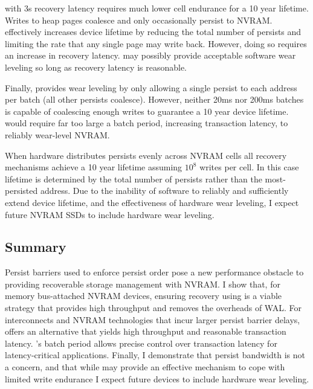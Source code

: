 \NVDisk with 3s recovery latency requires much lower cell endurance for a 10 year lifetime.
Writes to heap pages coalesce and only occasionally persist to NVRAM.
\NVDisk effectively increases device lifetime by reducing the total number of persists and limiting the rate that any single page may write back.
However, doing so requires an increase in recovery latency.
\NVDisk may possibly provide acceptable software wear leveling so long as recovery latency is reasonable.

Finally, \GroupCommit provides wear leveling by only allowing a single persist to each address per batch (all other persists coalesce).
However, neither 20ms nor 200ms batches is capable of coalescing enough writes to guarantee a 10 year device lifetime.
\GroupCommit would require far too large a batch period, increasing transaction latency, to reliably wear-level NVRAM.

When hardware distributes persists evenly across NVRAM cells all recovery mechanisms achieve a 10 year lifetime assuming $10^8$ writes per cell.
In this case lifetime is determined by the total number of persists rather than the most-persisted address.
Due to the inability of software to reliably and sufficiently extend device lifetime, and the effectiveness of hardware wear leveling, I expect future NVRAM SSDs to include hardware wear leveling.

\subsection{Summary}
\label{sec:OLTP_eval:Persists:Summary}
Persist barriers used to enforce persist order pose a new performance obstacle to providing recoverable storage management with NVRAM.
I show that, for memory bus-attached NVRAM devices, ensuring recovery using \InPlace is a viable strategy that provides high throughput and removes the overheads of WAL.
For interconnects and NVRAM technologies that incur larger persist barrier delays, \GroupCommit offers an alternative that yields high throughput and reasonable transaction latency.
\GroupCommit's batch period allows precise control over transaction latency for latency-critical applications.
Finally, I demonstrate that persist bandwidth is not a concern, and that while \NVDisk may provide an effective mechanism to cope with limited write endurance I expect future devices to include hardware wear leveling.

